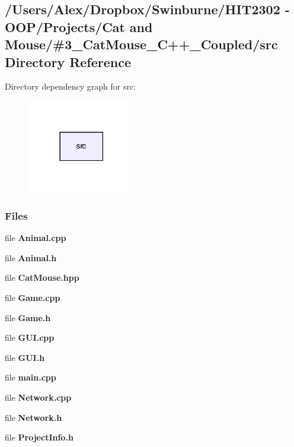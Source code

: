 \subsection{/\-Users/\-Alex/\-Dropbox/\-Swinburne/\-H\-I\-T2302 -\/ O\-O\-P/\-Projects/\-Cat and Mouse/\#3\-\_\-\-Cat\-Mouse\-\_\-\-C++\-\_\-\-Coupled/src Directory Reference}
\label{dir_68267d1309a1af8e8297ef4c3efbcdba}
Directory dependency graph for src\-:
\nopagebreak
\begin{figure}[H]
\begin{center}
\leavevmode
\includegraphics[width=134pt]{dir_68267d1309a1af8e8297ef4c3efbcdba_dep}
\end{center}
\end{figure}
\subsubsection*{Files}
\begin{DoxyCompactItemize}
\item 
file {\bf Animal.\-cpp}
\item 
file {\bf Animal.\-h}
\item 
file {\bf Cat\-Mouse.\-hpp}
\item 
file {\bf Game.\-cpp}
\item 
file {\bf Game.\-h}
\item 
file {\bf G\-U\-I.\-cpp}
\item 
file {\bf G\-U\-I.\-h}
\item 
file {\bf main.\-cpp}
\item 
file {\bf Network.\-cpp}
\item 
file {\bf Network.\-h}
\item 
file {\bf Project\-Info.\-h}
\end{DoxyCompactItemize}
